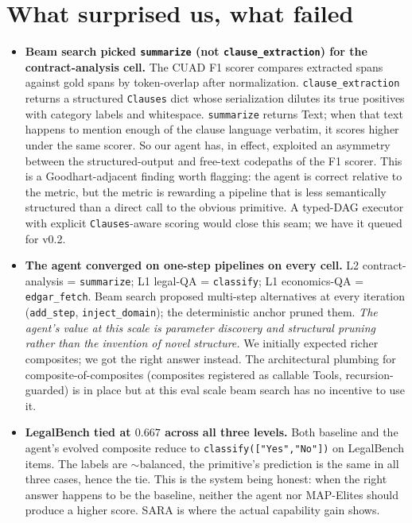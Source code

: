 \documentclass[11pt,a4paper]{article}
\begin{document}
\section{What surprised us, what failed}\label{sec:surprises}
\begin{itemize}[leftmargin=1.2em]
\item \textbf{Beam search picked \texttt{summarize} (not \texttt{clause\_extraction}) for the contract-analysis cell.} The CUAD F1 scorer compares extracted spans against gold spans by token-overlap after normalization. \texttt{clause\_extraction} returns a structured \texttt{Clauses} dict whose serialization dilutes its true positives with category labels and whitespace. \texttt{summarize} returns Text; when that text happens to mention enough of the clause language verbatim, it scores higher under the same scorer. So our agent has, in effect, exploited an asymmetry between the structured-output and free-text codepaths of the F1 scorer. This is a Goodhart-adjacent finding worth flagging: the agent is correct relative to the metric, but the metric is rewarding a pipeline that is less semantically structured than a direct call to the obvious primitive. A typed-DAG executor with explicit \texttt{Clauses}-aware scoring would close this seam; we have it queued for v0.2.

\item \textbf{The agent converged on one-step pipelines on every cell.} L2 contract-analysis = \texttt{summarize}; L1 legal-QA = \texttt{classify}; L1 economics-QA = \texttt{edgar\_fetch}. Beam search proposed multi-step alternatives at every iteration (\texttt{add\_step}, \texttt{inject\_domain}); the deterministic anchor pruned them. \emph{The agent's value at this scale is parameter discovery and structural pruning rather than the invention of novel structure.} We initially expected richer composites; we got the right answer instead. The architectural plumbing for composite-of-composites (composites registered as callable Tools, recursion-guarded) is in place but at this eval scale beam search has no incentive to use it.

\item \textbf{LegalBench tied at $0.667$ across all three levels.} Both baseline and the agent's evolved composite reduce to \texttt{classify(["Yes","No"])} on LegalBench items. The labels are $\sim$balanced, the primitive's prediction is the same in all three cases, hence the tie. This is the system being honest: when the right answer happens to be the baseline, neither the agent nor MAP-Elites should produce a higher score. SARA is where the actual capability gain shows.


\end{itemize}
\end{document}
